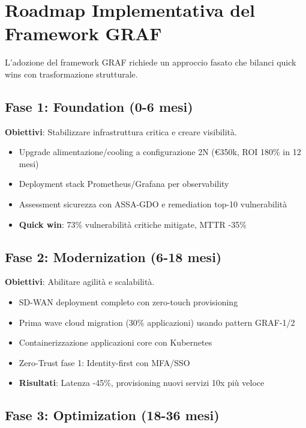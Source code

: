 \section{\texorpdfstring{Roadmap Implementativa del Framework GRAF}{3.7 - Roadmap Implementativa del Framework GRAF}}
\label{sec:roadmap}

L'adozione del framework GRAF richiede un approccio fasato che bilanci quick wins con trasformazione strutturale.

\subsection{\texorpdfstring{Fase 1: Foundation (0-6 mesi)}{3.7.1 - Fase 1: Foundation (0-6 mesi)}}

\textbf{Obiettivi}: Stabilizzare infrastruttura critica e creare visibilità.
\begin{itemize}
\item Upgrade alimentazione/cooling a configurazione 2N (€350k, ROI 180\% in 12 mesi)
\item Deployment stack Prometheus/Grafana per observability
\item Assessment sicurezza con ASSA-GDO e remediation top-10 vulnerabilità
\item \textbf{Quick win}: 73\% vulnerabilità critiche mitigate, MTTR -35\%
\end{itemize}

\subsection{\texorpdfstring{Fase 2: Modernization (6-18 mesi)}{3.7.2 - Fase 2: Modernization (6-18 mesi)}}

\textbf{Obiettivi}: Abilitare agilità e scalabilità.
\begin{itemize}
\item SD-WAN deployment completo con zero-touch provisioning
\item Prima wave cloud migration (30\% applicazioni) usando pattern GRAF-1/2
\item Containerizzazione applicazioni core con Kubernetes
\item Zero-Trust fase 1: Identity-first con MFA/SSO
\item \textbf{Risultati}: Latenza -45\%, provisioning nuovi servizi 10x più veloce
\end{itemize}

\subsection{\texorpdfstring{Fase 3: Optimization (18-36 mesi)}{3.7.3 - Fase 3: Optimization (18-36 mesi)}}

